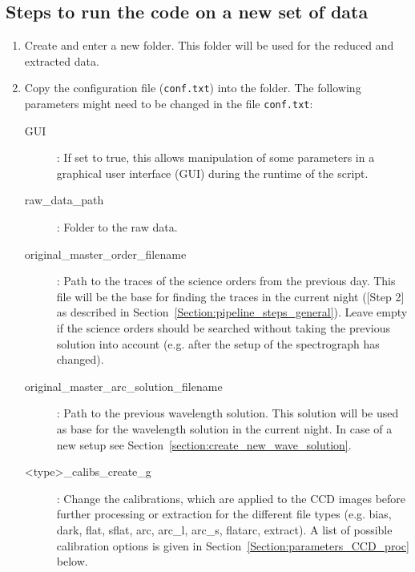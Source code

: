 \documentclass[10pt,a4paper]{article}
\begin{document}
\subsection{Steps to run the code on a new set of data}
\label{section:steps_new_data_set}
\noindent

\begin{enumerate}
  \item Create and enter a new folder. This folder will be used for the reduced and extracted data.
  \item Copy the configuration file (\verb|conf.txt|) into the folder. The following parameters might need to be changed in the file \verb|conf.txt|:
  \begin{description}
    \item[GUI] : If set to true, this allows manipulation of some parameters in a graphical user interface (GUI) during the runtime of the script.
    \item[raw\_data\_path] : Folder to the raw data.
    \item[original\_master\_order\_filename] : Path to the traces of the science orders from the previous day. This file will be the base for finding the traces in the current night ([Step 2] as described in Section~\ref{Section:pipeline_steps_general}). Leave empty if the science orders should be searched without taking the previous solution into account (e.g. after the setup of the spectrograph has changed).
    \item[original\_master\_arc\_solution\_filename] : Path to the previous wavelength solution. This solution will be used as base for the wavelength solution in the current night. In case of a new setup see Section~\ref{section:create_new_wave_solution}.
    \item[\textless type\textgreater\_calibs\_create\_g] : Change the calibrations, which are applied to the CCD images before further processing or extraction for the different file types (e.g. bias, dark, flat, sflat, arc, arc\_l, arc\_s, flatarc, extract). A list of possible calibration options is given in Section~\ref{Section:parameters_CCD_proc} below.

\end{description}
\end{enumerate}
\end{document}
